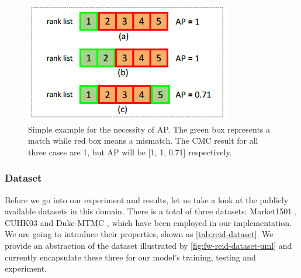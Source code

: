 \begin{figure}
    \begin{center}
        \includegraphics[scale=0.7]{figures/eval_cmc_vs_map.png}
    \end{center}
    \caption[Simple example for the necessity of AP]
    {Simple example for the necessity of AP. The green box represents a match
        while red box means a mismatch. The CMC result for all three cases are
        1, but AP will be [1, 1, 0.71] respectively.}
    \label{fig:map-mini-exmaple}
\end{figure}

\subsubsection{Dataset}
\label{sec:eval-recognizer-dataset}

Before we go into our experiment and results, let us take a look at the publicly
available datasets in this domain. There is a total of three datasets: Market1501
\cite{dataset-market1501-2015}, CUHK03 \cite{dataset-cuhk03-2014} and Duke-MTMC
\cite{dataset-dukemtmc-2016}, which have been employed in our implementation. We
are going to introduce their properties, shown as
\autoref{tab:reid-dataset}. We provide an abstraction of the dataset
illustrated by \autoref{fig:fw-reid-dataset-uml} and currently encapsulate
these three for our model's training, testing and experiment.

